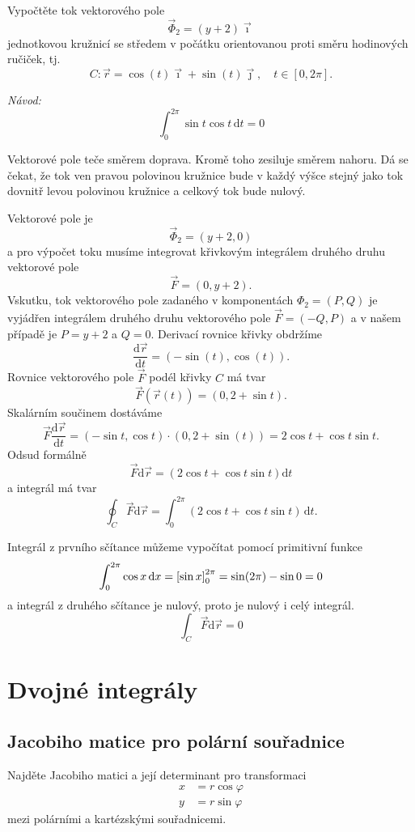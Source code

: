 Vypočtěte tok vektorového pole $$\vec \Phi_2=(y+2)\vec\imath$$ jednotkovou kružnicí se středem v počátku orientovanou proti směru hodinových ručiček, tj. $$C\colon \vec r=\cos(t)\vec \imath+\sin(t)\vec\jmath, \quad t\in[0,2\pi].$$


\textit{Návod:} $$\int_0^{2\pi}\sin t\cos t\,\mathrm dt=0$$

\reseni
Vektorové pole teče směrem doprava. Kromě toho zesiluje směrem nahoru. Dá se čekat, že tok ven pravou polovinou kružnice bude v každý výšce stejný jako tok dovnitř levou polovinou kružnice a celkový tok bude nulový.

Vektorové pole je $$\vec \Phi_2=(y+2,0)$$ a pro výpočet toku musíme integrovat křivkovým integrálem druhého druhu vektorové pole $$\vec F=(0,y+2).$$
Vskutku, tok vektorového pole zadaného v komponentách $\Phi_2=(P,Q)$ je vyjádřen integrálem druhého druhu vektorového pole $\vec F=(-Q,P)$ a v našem případě je $P=y+2$ a $Q=0$. Derivací rovnice křivky obdržíme
$$\frac{\mathrm d\vec r}{\mathrm dt}=(-\sin (t),\cos (t)).$$
Rovnice vektorového pole $\vec F$ podél křivky $C$ má tvar
$$\vec F(\vec r(t))=(0,2+\sin t).$$
Skalárním součinem dostáváme
$$\vec F \frac{\mathrm d\vec r}{\mathrm dt}=
(-\sin t,\cos t)\cdot (0,2+\sin (t)) = 2\cos t+\cos t \sin t.
$$
Odsud formálně $$\vec F\mathrm d\vec r=(2\cos t+\cos t\sin t)\mathrm dt$$
a integrál má tvar
$$\oint_C\vec F\mathrm d\vec r=\int_0^{2\pi }(2\cos t+\cos t\sin t)\,\mathrm dt.$$

Integrál z prvního sčítance můžeme vypočítat pomocí primitivní funkce
$$\int_0^{2\pi} \cos x\,\mathrm dx=\qty[\sin x]_0^{2\pi}=\sin(2\pi)-\sin 0 =0$$ a integrál z druhého sčítance je nulový, proto je nulový i celý integrál.
$$\int_C\vec F\mathrm d\vec r=0$$


\konec


\stranka
\section{Dvojné integrály}


\subsection{Jacobiho matice pro polární souřadnice}

Najděte Jacobiho matici a její determinant pro transformaci 
\begin{equation*}
  \begin{aligned}
    x&=r\cos \varphi\\
    y&=r\sin \varphi
  \end{aligned}
\end{equation*}
mezi polárními a kartézskými souřadnicemi.


